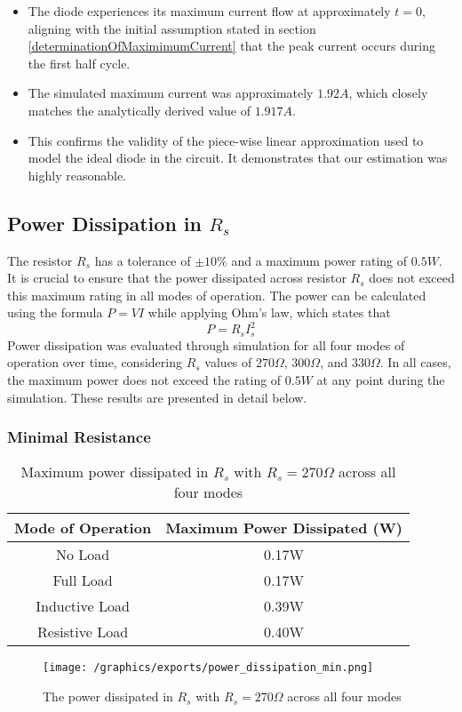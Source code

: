 \begin{itemize}
\item The diode experiences its maximum current flow at approximately $t = 0$, aligning with the initial assumption stated in section \ref{determinationOfMaximimumCurrent} that the peak current occurs during the first half cycle.
\item The simulated maximum current was approximately $1.92A$, which closely matches the analytically derived value of $1.917A$.
\item This confirms the validity of the piece-wise linear approximation used to model the ideal diode in the circuit. It demonstrates that our estimation was highly reasonable.
\end{itemize}

\pagebreak
\subsection{Power Dissipation in $R_s$}
The resistor $R_s$ has a tolerance of $\pm 10\%$ and a maximum power rating of $0.5W$. It is crucial to ensure that the power dissipated across resistor $R_s$ does not exceed this maximum rating in all modes of operation. The power can be calculated using the formula $P = VI$ while applying Ohm's law, which states that
\begin{equation}
	P=R_sI_s^2
\end{equation}
Power dissipation was evaluated through simulation for all four modes of operation over time, considering $R_s$ values of $270\Omega$, $300\Omega$, and $330\Omega$. In all cases, the maximum power does not exceed the rating of $0.5W$ at any point during the simulation. These results are presented in detail below.

\subsubsection{Minimal Resistance}
\begin{table}[H]
\centering
\begin{tabular}{|c|c|}\hline
	\textbf{Mode of Operation} & \textbf{Maximum Power Dissipated (W)} \\\hline
	No Load & 0.17W \\
	Full Load &  0.17W \\
	Inductive Load & 0.39W \\
	Resistive Load & 0.40W \\\hline
\end{tabular}
\caption{Maximum power dissipated in $R_s$ with $R_s = 270\Omega$ across all four modes}
\end{table}
\begin{figure}[H]
	\centering
	\texttt{[image: /graphics/exports/power\_dissipation\_min.png]}
	\caption{The power dissipated in $R_s$ with $R_s = 270\Omega$ across all four modes}
\end{figure}

